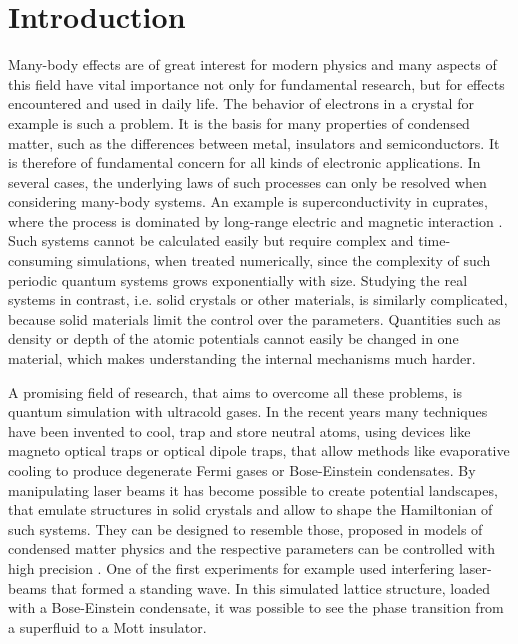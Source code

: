 \chapter{Introduction}

Many-body effects are of great interest for modern physics and many aspects of this field have vital importance not only for fundamental research, but for effects encountered and used in daily life. The behavior of electrons in a crystal for example is such a problem. It is the basis for many properties of condensed matter, such as the differences between metal, insulators and semiconductors. It is therefore of fundamental concern for all kinds of electronic applications. In several cases, the underlying laws of such processes can only be resolved when considering many-body systems. An example is superconductivity in cuprates, where the process is dominated by long-range electric and magnetic interaction \cite{cuprates}. Such systems cannot be calculated easily but require complex and time-consuming simulations, when treated numerically, since the complexity of such periodic quantum systems grows exponentially with size\cite{feynman}. Studying the real systems in contrast, i.e. solid crystals or other materials, is similarly complicated, because solid materials limit the control over the parameters. Quantities such as density or depth of the atomic potentials cannot easily be changed in one material, which makes understanding the internal mechanisms much harder. 

A promising field of research, that aims to overcome all these problems, is quantum simulation with ultracold gases. In the recent years many techniques have been invented to cool, trap and store neutral atoms, using devices like magneto optical traps or optical dipole traps\cite{metcalf}, that allow methods like evaporative cooling to produce degenerate Fermi gases or Bose-Einstein condensates. By manipulating laser beams it has become possible to create potential landscapes, that emulate structures in solid crystals and allow to shape the Hamiltonian of such systems. They can be designed to resemble those, proposed in models of condensed matter physics and the respective parameters can be controlled with high precision \cite{bloch}. One of the first experiments for example used interfering laser-beams that formed a standing wave. In this simulated lattice structure, loaded with a Bose-Einstein condensate, it was possible to see the phase transition from a superfluid to a Mott insulator\cite{greiner}.


